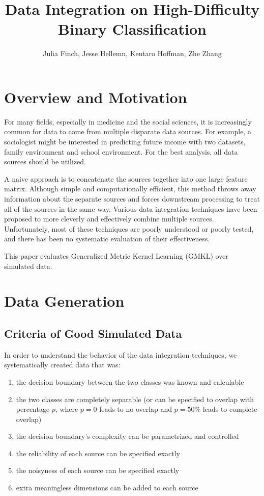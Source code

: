 \documentclass{article}
\begin{document}
\title{Data Integration on High-Difficulty Binary Classification}
\author{Julia Finch, Jesse Hellemn, Kentaro Hoffman, Zhe Zhang}
\maketitle


\section{Overview and Motivation}
For many fields, especially in medicine and the social sciences, it is
increasingly common for data to come from multiple disparate data sources. For
example, a sociologist might be interested in predicting future income with two
datasets, family environment and school environment. For the best analysis, all
data sources should be utilized.


A naive approach is to concatenate the sources together into one large feature
matrix. Although simple and computationally efficient, this method throws away
information about the separate sources and forces downstream processing to
treat all of the sources in the same way. Various data integration techniques
have been proposed to more cleverly and effectively combine multiple sources.
Unfortunately, most of these techniques are poorly understood or poorly tested,
and there has been no systematic evaluation of their effectiveness.


This paper evaluates Generalized Metric Kernel Learning (GMKL) over simulated
data.


\section{Data Generation}

\subsection{Criteria of Good Simulated Data}

In order to understand the behavior of the data integration techniques, we
systematically created data that was:

\begin{enumerate}
    \item the decision boundary between the two classes was known and calculable
    \item the two classes are completely separable (or can be specified to
        overlap with percentage $p$, where $p=0$ leads to no overlap and
        $p=50$\% leads to complete overlap)
    \item the decision boundary's complexity can be parametrized and controlled
    \item the reliability of each source can be specified exactly
    \item the noisyness of each source can be specified exactly
    \item \label{criteria:noise_dims} extra meaningless dimensions can be added
        to each source
\end{enumerate}
\end{document}
